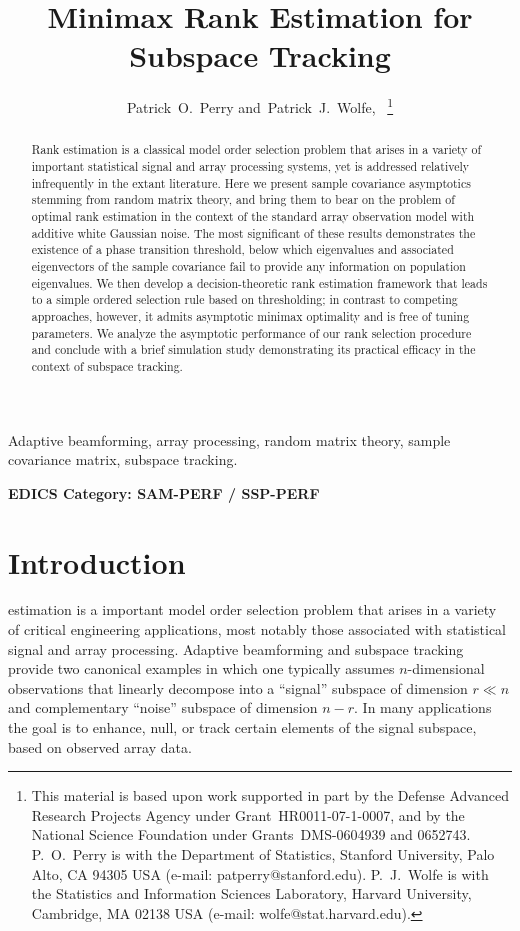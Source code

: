 \documentclass[final]{IEEEtran} %
\title{Minimax Rank Estimation for Subspace Tracking}%
\author{Patrick~O.~Perry and~Patrick~J.~Wolfe,~\IEEEmembership{Senior Member,~IEEE}%
                \thanks{This material is based upon work
          supported in part by the Defense Advanced Research Projects Agency under Grant~HR0011-07-1-0007, and by the National Science Foundation under Grants~DMS-0604939 and 0652743.
          \newline \indent P.~O.~Perry is with the Department of Statistics, Stanford University, Palo Alto, CA 94305 USA (e-mail: patperry@stanford.edu).  P.~J.~Wolfe is with the Statistics and Information Sciences Laboratory, Harvard University, Cambridge, MA 02138 USA (e-mail: wolfe@stat.harvard.edu).
          }
}
\begin{document}
\maketitle

\begin{abstract}%
Rank estimation is a classical model order selection problem that arises in a variety of important statistical signal and array processing systems, yet is addressed relatively infrequently in the extant literature.  Here we present sample covariance asymptotics stemming from random matrix theory, and bring them to bear on the problem of optimal rank estimation in the context of the standard array observation model with additive white Gaussian noise.  The most significant of these results demonstrates the existence of a phase transition threshold, below which eigenvalues and associated eigenvectors of the sample covariance fail to provide any information on population eigenvalues.  We then develop a decision-theoretic rank estimation framework that leads to a simple ordered selection rule based on thresholding; in contrast to competing approaches, however, it admits asymptotic minimax optimality and is free of tuning parameters.  We analyze the asymptotic performance of our rank selection procedure and conclude with a brief simulation study demonstrating its practical efficacy in the context of subspace tracking.
\end{abstract}

\begin{IEEEkeywords}%
Adaptive beamforming, array processing, random matrix theory, sample covariance matrix, subspace tracking.
\end{IEEEkeywords}

\ifCLASSOPTIONpeerreview
\begin{center}%
\bfseries EDICS Category: SAM-PERF / SSP-PERF
\end{center}
\fi
\IEEEpeerreviewmaketitle

\section{Introduction}
\label{sec:intro}

 estimation is a important model order selection problem that arises in a variety of critical engineering applications, most notably those associated with statistical signal and array processing.  Adaptive beamforming and subspace tracking provide two canonical examples in which one typically assumes $n$-dimensional observations that linearly decompose into a ``signal'' subspace of dimension $r \ll n$ and complementary ``noise'' subspace of dimension $n - r$.  In many applications the goal is to enhance, null, or track certain elements of the signal subspace, based on observed array data.
\end{document}

